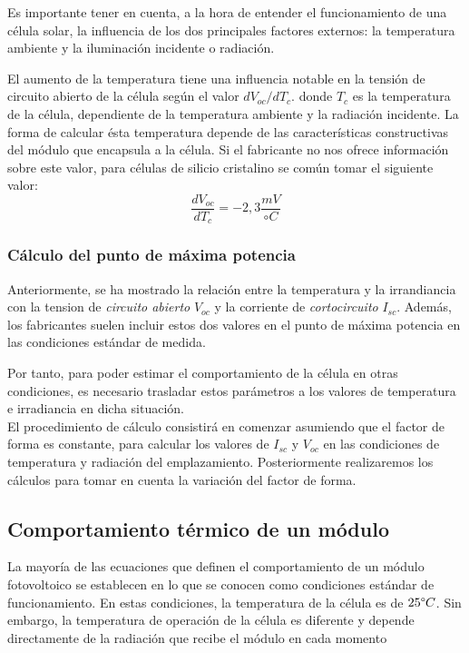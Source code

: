 Es importante tener en cuenta, a la hora de entender el funcionamiento de una célula solar, la influencia de los dos principales factores externos: la temperatura ambiente y la iluminación incidente o radiación.

El aumento de la temperatura tiene una influencia notable en la tensión de circuito abierto de la célula según el valor $dV_{oc}/dT_c$. donde $T_c$ es la temperatura de la célula, dependiente de la temperatura ambiente y la radiación incidente. La forma de calcular ésta temperatura depende de las características constructivas del módulo que encapsula a la célula. Si el fabricante no nos ofrece información sobre este valor, para células de silicio cristalino se común tomar el siguiente valor:
\begin{equation}
\frac{dV_{oc}}{dT_c}=-2,3\frac{mV}{ \circ C}
\end{equation}

\subsubsection{Cálculo del punto de máxima potencia}

Anteriormente, se ha mostrado la relación entre la temperatura y la irrandiancia con la tension de \textit{circuito abierto} $V_{oc}$ y la corriente de \textit{cortocircuito} $I_{sc}$. Además, los fabricantes suelen incluir estos dos valores en el punto de máxima potencia en las condiciones estándar de medida.

Por tanto, para poder estimar el comportamiento de la célula en otras condiciones, es necesario trasladar estos parámetros a los valores de temperatura e irradiancia en dicha situación.\\

El procedimiento de cálculo consistirá en comenzar asumiendo que el factor de forma es constante, para calcular los valores de $I_{sc}$ y $V_{oc}$ en las condiciones de temperatura y radiación del emplazamiento. Posteriormente realizaremos los cálculos para tomar en cuenta la variación del factor de forma.

\subsection{Comportamiento térmico de un módulo}
\label{section:term_behaviour}

La mayoría de las ecuaciones que definen el comportamiento de un módulo fotovoltoico se establecen en lo que se conocen como condiciones estándar de funcionamiento. En estas condiciones, la temperatura de la célula es de $25\degree C$. Sin embargo, la temperatura de operación de la célula es diferente y depende directamente de la radiación que recibe el módulo en cada momento

